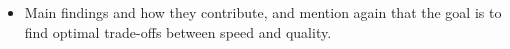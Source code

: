 \begin{itemize}
    \item Main findings and how they contribute, and mention again that the goal is to find optimal trade-offs between speed and quality.
\end{itemize}






